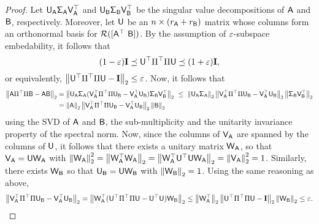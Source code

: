 \begin{proof}
Let $\matU_{\matA} \matSig_{\matA} \matV_{\matA}^\top$ and $\matU_{\matB} \matSig_{\matB} \matV_{\matB}^\top$ be the singular value decompositions of $\matA$ and $\matB$, respectively. Moreover, let $\matU$ be an $n\times (r_{\matA}+r_{\matB})$ matrix whose columns form an orthonormal basis for $\colspan{[\matA^\top\ \matB]}$. By the assumption of $\eps$-subspace embedability, it follows that
\[
(1-\eps) \matI \preceq \matU^\top \Pi^\top \Pi \matU \preceq (1+\eps) \matI,
\]
or equivalently, $\norm{\matU^\top \Pi^\top \Pi \matU - \matI } \leq \eps$. Now, it follows that
\begin{align*}
	\norm{\matA\Pi^\top \Pi \matB - \matA \matB} & = \norm{\matU_{\matA} \matSig_{\matA} (\matV_{\matA}^\top\Pi^\top \Pi \matU_{\matB} - \matV_{\matA}^\top \matU_{\matB} )\matSig_{\matB} \matV_{\matB}^\top } \ \leq \ \norm{\matU_{\matA} \matSig_{\matA}} \norm{\matV_{\matA}^\top\Pi^\top \Pi \matU_{\matB} - \matV_{\matA}^\top \matU_{\matB} } \norm{\matSig_{\matB} \matV_{\matB}^\top} \\
						& = \norm{\matA} \norm{\matV_{\matA}^\top\Pi^\top \Pi \matU_{\matB} - \matV_{\matA}^\top \matU_{\matB} } \norm{\matB}
\end{align*}
using the SVD of $\matA$ and $\matB$, the sub-multiplicity and the unitarity invariance property of the spectral norm. Now, since the columns of $\matV_{\matA}$ are spanned by the columns of $\matU$, it follows that there exists a unitary matrix $\matW_{\matA}$, so that $\matV_{\matA} = \matU \matW_{\matA}$ with $\norm{\matW_{\matA}}^2 = \norm{\matW_{\matA}^\top \matW_{\matA}} = \norm{\matW_{\matA}^\top \matU^\top \matU\matW_{\matA}}= \norm{\matV_{\matA}}^2 =1$. Similarly, there exists $\matW_{\matB}$ so that $\matU_{\matB} = \matU \matW_{\matB}$ with $\norm{\matW_{\matB}}=1$. Using the same reasoning as above,
\begin{align*}
	\norm{\matV_{\matA}^\top\Pi^\top \Pi \matU_{\matB} - \matV_{\matA}^\top \matU_{\matB} } = \norm{\matW_{\matA}^\top (\matU^\top\Pi^\top \Pi \matU - \matU^\top \matU) \matW_{\matB}}  \leq  \norm{\matW_{\matA}^\top} \norm{\matU^\top\Pi^\top \Pi \matU - \matI} \norm{\matW_{\matB}} \leq \eps.
\end{align*}
\end{proof}
%

